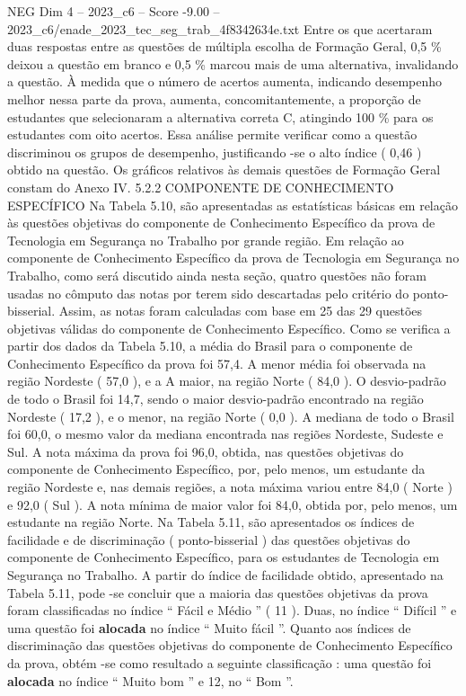 \begin{textsample}{NEG Dim 4 – 2023\_c6 – Score -9.00 – 2023\_c6/enade\_2023\_tec\_seg\_trab\_4f8342634e.txt}
Entre os que acertaram duas respostas entre as questões de múltipla escolha de Formação Geral, 0,5 \% deixou a questão em branco e 0,5 \% marcou mais de uma alternativa, invalidando a questão.
À medida que o número de acertos aumenta, indicando desempenho melhor nessa parte da prova, aumenta, concomitantemente, a proporção de estudantes que selecionaram a alternativa correta C, atingindo 100 \% para os estudantes com oito acertos.
Essa análise permite verificar como a questão discriminou os grupos de desempenho, justificando -se o alto índice ( 0,46 ) obtido na questão.
Os gráficos relativos às demais questões de Formação Geral constam do Anexo IV. 5.2.2 COMPONENTE DE CONHECIMENTO ESPECÍFICO Na Tabela 5.10, são apresentadas as estatísticas básicas em relação às questões objetivas do componente de Conhecimento Específico da prova de Tecnologia em Segurança no Trabalho por grande região.
Em relação ao componente de Conhecimento Específico da prova de Tecnologia em Segurança no Trabalho, como será discutido ainda nesta seção, quatro questões não foram usadas no cômputo das notas por terem sido descartadas pelo critério do ponto-bisserial.
Assim, as notas foram calculadas com base em 25 das 29 questões objetivas válidas do componente de Conhecimento Específico.
Como se verifica a partir dos dados da Tabela 5.10, a média do Brasil para o componente de Conhecimento Específico da prova foi 57,4.
A menor média foi observada na região Nordeste ( 57,0 ), e a A maior, na região Norte ( 84,0 ).
O desvio-padrão de todo o Brasil foi 14,7, sendo o maior desvio-padrão encontrado na região Nordeste ( 17,2 ), e o menor, na região Norte ( 0,0 ).
A mediana de todo o Brasil foi 60,0, o mesmo valor da mediana encontrada nas regiões Nordeste, Sudeste e Sul.
A nota máxima da prova foi 96,0, obtida, nas questões objetivas do componente de Conhecimento Específico, por, pelo menos, um estudante da região Nordeste e, nas demais regiões, a nota máxima variou entre 84,0 ( Norte ) e 92,0 ( Sul ).
A nota mínima de maior valor foi 84,0, obtida por, pelo menos, um estudante na região Norte.
Na Tabela 5.11, são apresentados os índices de facilidade e de discriminação ( ponto-bisserial ) das questões objetivas do componente de Conhecimento Específico, para os estudantes de Tecnologia em Segurança no Trabalho.
A partir do índice de facilidade obtido, apresentado na Tabela 5.11, pode -se concluir que a maioria das questões objetivas da prova foram classificadas no índice “ Fácil e Médio ” ( 11 ).
Duas, no índice “ Difícil ” e uma questão foi \textbf{alocada} no índice “ Muito fácil ”.
Quanto aos índices de discriminação das questões objetivas do componente de Conhecimento Específico da prova, obtém -se como resultado a seguinte classificação : uma questão foi \textbf{alocada} no índice “ Muito bom ” e 12, no “ Bom ”.

\end{textsample}
